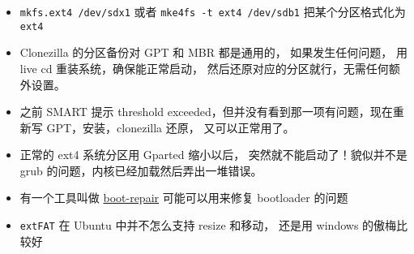 \begin{itemize}
\item \verb`mkfs.ext4 /dev/sdx1` 或者 \verb`mke4fs -t ext4 /dev/sdb1` 把某个分区格式化为 \verb`ext4`
\item Clonezilla 的分区备份对 GPT 和 MBR 都是通用的， 如果发生任何问题， 用 live cd 重装系统，确保能正常启动， 然后还原对应的分区就行，无需任何额外设置。
\item 之前 SMART 提示 threshold exceeded，但并没有看到那一项有问题，现在重新写 GPT，安装，clonezilla 还原， 又可以正常用了。
\item  正常的 ext4 系统分区用 Gparted 缩小以后， 突然就不能启动了！貌似并不是 grub 的问题，内核已经加载然后弄出一堆错误。
\item 有一个工具叫做 \href{https://help.ubuntu.com/community/Boot-Repair}{boot-repair} 可能可以用来修复 bootloader 的问题
\item \verb`extFAT` 在 Ubuntu 中并不怎么支持 resize 和移动， 还是用 windows 的傲梅比较好
\end{itemize}

